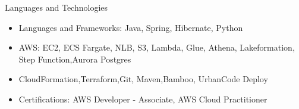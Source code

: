 \documentclass[]{mcdowellcv}
\begin{document}
    \makeheader

    \begin{cvsection}{Languages and Technologies}
        \begin{cvsubsection}{}{}{}
            \begin{itemize}
                \item Languages and Frameworks: Java, Spring, Hibernate, Python
                \item AWS: EC2, ECS Fargate, NLB, S3, Lambda, Glue, Athena, Lakeformation, Step Function,Aurora Postgres
                \item CloudFormation,Terraform,Git, Maven,Bamboo, UrbanCode Deploy
                \item Certifications: AWS Developer - Associate, AWS Cloud Practitioner
            \end{itemize}
        \end{cvsubsection}
    \end{cvsection}
\end{document}
